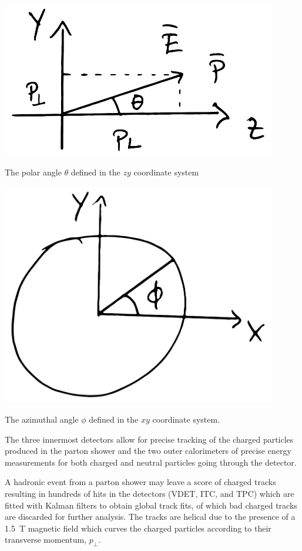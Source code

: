 \begin{marginfigure}
  \centerfloat
  \includegraphics[width=0.9\textwidth]{figures/yz_coordinate_system/yz_coords.pdf}
  \caption[Polar angle]{The polar angle $\theta$ defined in the $zy$ coordinate system}
  \label{fig:hep:aleph_detector_theta}
\end{marginfigure}
\begin{marginfigure}
  \centerfloat
  \includegraphics[width=0.9\textwidth]{figures/xy_coordinate_system/xy_coords.pdf}
  \caption[Azimuthal angle]{The azimuthal angle $\phi$ defined in the $xy$ coordinate system. }
  \label{fig:hep:aleph_detector_phi}
\end{marginfigure}

The three innermost detectors allow for precise tracking of the charged particles produced in the parton shower and the two outer calorimeters of precise energy measurements for both charged and neutral particles going through the detector.

A hadronic event from a parton shower may leave a score of charged tracks resulting in hundreds of hits in the detectors (VDET, ITC, and TPC) which are fitted with Kalman filters \autocite{kalmanNewApproachLinear1960} to obtain global track fits, of which bad charged tracks are discarded for further analysis. The tracks are helical due to the presence of a \SI{1.5}{T} magnetic field which curves the charged particles according to their transverse momentum, $p_\perp$.

